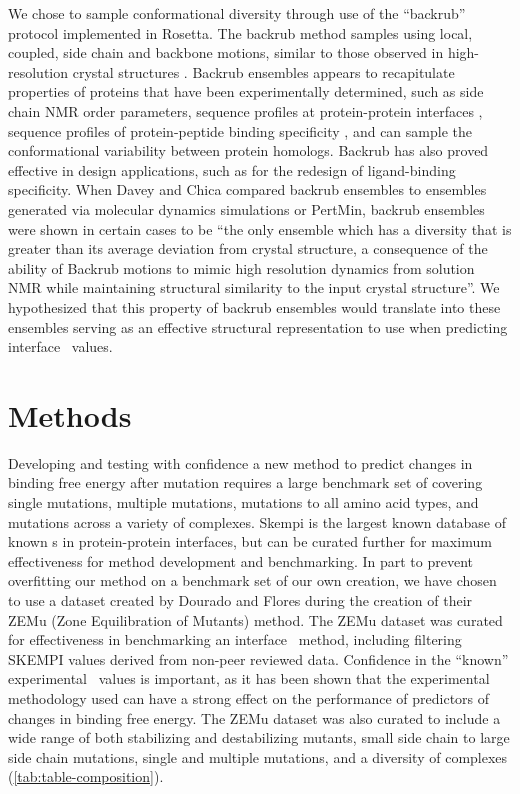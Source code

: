We chose to sample conformational diversity through use of the ``backrub'' protocol implemented in Rosetta.
The backrub method samples using local, coupled, side chain and backbone motions, similar to those observed in high-resolution crystal structures \cite{davis_backrub_2006}.
Backrub ensembles appears to recapitulate properties of proteins that have been experimentally determined, such as side chain NMR order parameters\cite{friedland_simple_2008}, sequence profiles at protein-protein interfaces \cite{humphris_prediction_2008}, sequence profiles of protein-peptide binding specificity \cite{smith_structure-based_2010,smith_predicting_2011}, and can sample the conformational variability between protein homologs\cite{schenkelberg_protein_2016}.
Backrub has also proved effective in design applications, such as for the redesign of ligand-binding specificity\cite{ollikainen_coupling_2015}.
When Davey and Chica compared backrub ensembles to ensembles generated via molecular dynamics simulations or PertMin, backrub ensembles were shown in certain cases to be
``the only ensemble which has a diversity that is greater than its average deviation from crystal structure, a consequence of the ability of Backrub motions to mimic high resolution dynamics from solution NMR while maintaining structural similarity to the input crystal structure''.\cite{davey_improving_2014}
We hypothesized that this property of backrub ensembles would translate into these ensembles serving as an effective structural representation to use when predicting interface \ddg\ values.

\section{Methods}

Developing and testing with confidence a new method to predict changes in binding free energy after mutation requires a large benchmark set of covering single mutations, multiple mutations, mutations to all amino acid types, and mutations across a variety of complexes.
Skempi \cite{moal_skempi:_2012} is the largest known database of known \ddg s in protein-protein interfaces, but can be curated further for maximum effectiveness for method development and benchmarking.
In part to prevent overfitting our method on a benchmark set of our own creation, we have chosen to use a dataset created by Dourado and Flores\cite{dourado_multiscale_2014} during the creation of their ZEMu (Zone Equilibration of Mutants) method.
The ZEMu dataset was curated for effectiveness in benchmarking an interface \ddg\ method, including filtering SKEMPI values derived from non-peer reviewed data.
Confidence in the ``known'' experimental \ddg\ values is important, as it has been shown that the experimental methodology used can have a strong effect on the performance of predictors of changes in binding free energy\cite{geng_exploring_2016}.
The ZEMu dataset was also curated to include a wide range of both stabilizing and destabilizing mutants, small side chain to large side chain mutations, single and multiple mutations, and a diversity of complexes (\cref{tab:table-composition}).

